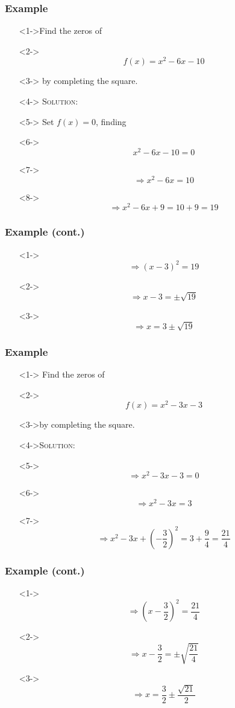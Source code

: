 \documentclass[handout]{beamer}
\begin{document}
\begin{frame}
	\frametitle{Example}
	\begin{enumerate}
		\item[]<1->Find the zeros of 
		\item[]<2-> \[ f(x)=x^{2}-6x-10 \] 
		\item[]<3-> by completing the square. 
		\item[]<4-> \textsc{Solution:} 
		\item[]<5-> Set $f(x)=0$, finding
		\item[]<6-> \[ x^{2}-6x-10=0 \]
		\item[]<7-> \[ \Rightarrow x^{2}-6x=10 \]
		\item[]<8->\[ \Rightarrow x^{2}-6x+9=10+9=19 \]
	\end{enumerate}
\end{frame}

\begin{frame}
	\frametitle{Example (cont.)} 
	\begin{enumerate}
		\item[]<1->\[ \Rightarrow (x-3)^{2}=19 \] 
		\item[]<2->\[ \Rightarrow x-3=\pm \sqrt{19} \] 
		\item[]<3->\[ \Rightarrow x=3 \pm \sqrt{19} \] 
	\end{enumerate}
\end{frame}

\begin{frame}
	\frametitle{Example}
	\begin{enumerate}
		\item[]<1-> Find the zeros of 
		\item[]<2->\[ f(x)=x^{2}-3x-3 \]
		\item[]<3->by completing the square.
		\item[]<4->\textsc{Solution:}  
		\item[]<5-> \[ \Rightarrow x^{2}-3x-3=0 \] 
		\item[]<6-> \[ \Rightarrow x^{2}-3x=3 \] 
		\item[]<7-> \[ \Rightarrow x^{2}-3x+\left( -\frac{3}{2}\right)^{2}=3+\frac{9}{4}=\frac{21}{4} \] 
	\end{enumerate}
\end{frame}

\begin{frame}
	\frametitle{Example (cont.)} 
	\begin{enumerate}
		\item[]<1-> \[ \Rightarrow \left( x-\frac{3}{2} \right)^{2}=\frac{21}{4} \] 
		\item[]<2-> \[ \Rightarrow x-\frac{3}{2}=\pm \sqrt{\frac{21}{4}} \] 
		\item[]<3->\[ \Rightarrow x=\frac{3}{2} \pm \frac{\sqrt{21}}{2} \] 
	\end{enumerate}
\end{frame}
\end{document}
